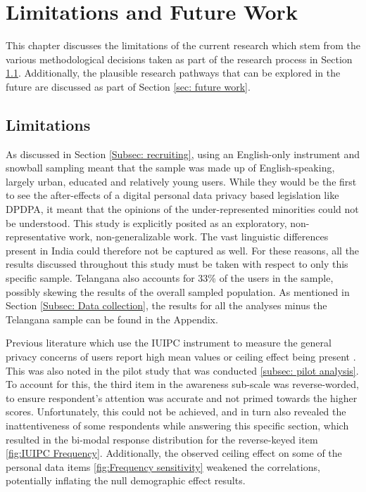 \chapter{Limitations and Future Work} \label{chapter:limitationsfutureworks}

This chapter discusses the limitations of the current research which stem from the various methodological decisions taken as part of the research process in Section \ref{sec: limitations}. Additionally, the plausible research pathways that can be explored in the future are discussed as part of Section \ref{sec: future work}.

\section{Limitations} \label{sec: limitations}

As discussed in Section \ref{Subsec: recruiting}, using an English-only instrument and snowball sampling meant that the sample was made up of English-speaking, largely urban, educated and relatively young users. While they would be the first to see the after-effects of a digital personal data privacy based legislation like DPDPA, it meant that the opinions of the under-represented minorities could not be understood. This study is explicitly posited as an exploratory, non-representative work, non-generalizable work. The vast linguistic differences present in India could therefore not be captured as well. For these reasons, all the results discussed throughout this study must be taken with respect to only this specific sample. Telangana also accounts for 33\% of the users in the sample, possibly skewing the results of the overall sampled population. As mentioned in Section \ref{Subsec: Data collection}, the results for all the analyses minus the Telangana sample can be found in the Appendix.

Previous literature which use the IUIPC instrument to measure the general privacy concerns of users report high mean values or ceiling effect being present \cite{gros_validity_2021, malhotra_internet_2004, 10.1145/3380960, 10.1145/3706598.3713912}. This was also noted in the pilot study that was conducted \ref{subsec: pilot analysis}. To account for this, the third item in the awareness sub-scale was reverse-worded, to ensure respondent's attention was accurate and not primed towards the higher scores. Unfortunately, this could not be achieved, and in turn also revealed the inattentiveness of some respondents while answering this specific section, which resulted in the bi-modal response distribution for the reverse-keyed item \ref{fig:IUIPC Frequency}. Additionally, the observed ceiling effect on some of the personal data items \ref{fig:Frequency sensitivity} weakened the correlations, potentially inflating the null demographic effect results. 

